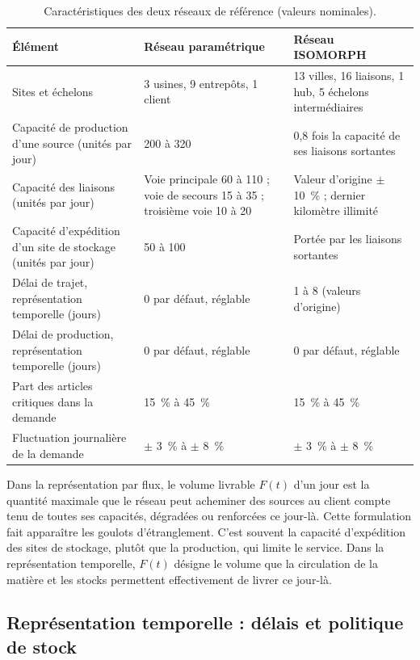 \begin{table}[htbp]
\caption{Caractéristiques des deux réseaux de référence (valeurs nominales).}
\label{tab:reseaux}
\footnotesize
\begin{tabularx}{\textwidth}{@{}P{4.2cm}LL@{}}
\toprule
\textbf{Élément} & \textbf{Réseau paramétrique} & \textbf{Réseau ISOMORPH} \\
\midrule
Sites et échelons & 3 usines, 9 entrepôts, 1 client & 13 villes, 16 liaisons, 1 hub, 5 échelons intermédiaires \\
Capacité de production d'une source (unités par jour) & 200 à 320 & 0,8 fois la capacité de ses liaisons sortantes \\
Capacité des liaisons (unités par jour) & Voie principale 60 à 110 ; voie de secours 15 à 35 ; troisième voie 10 à 20 & Valeur d'origine $\pm$ 10~\% ; dernier kilomètre illimité \\
Capacité d'expédition d'un site de stockage (unités par jour) & 50 à 100 & Portée par les liaisons sortantes \\
Délai de trajet, représentation temporelle (jours) & 0 par défaut, réglable & 1 à 8 (valeurs d'origine) \\
Délai de production, représentation temporelle (jours) & 0 par défaut, réglable & 0 par défaut, réglable \\
Part des articles critiques dans la demande & 15~\% à 45~\% & 15~\% à 45~\% \\
Fluctuation journalière de la demande & $\pm$ 3~\% à $\pm$ 8~\% & $\pm$ 3~\% à $\pm$ 8~\% \\
\bottomrule
\end{tabularx}
\end{table}

Dans la représentation par flux, le volume livrable $F(t)$ d'un jour est la quantité maximale que le réseau peut acheminer des sources au client compte tenu de toutes ses capacités, dégradées ou renforcées ce jour-là. Cette formulation fait apparaître les goulots d'étranglement. C'est souvent la capacité d'expédition des sites de stockage, plutôt que la production, qui limite le service. Dans la représentation temporelle, $F(t)$ désigne le volume que la circulation de la matière et les stocks permettent effectivement de livrer ce jour-là.

\subsection{Représentation temporelle : délais et politique de stock}
\label{sec:S3.2}


